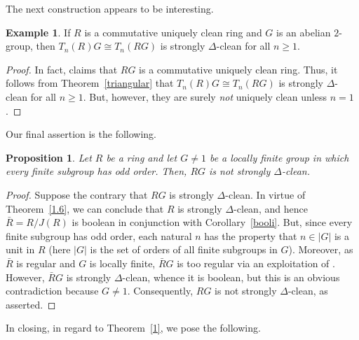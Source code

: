 \documentclass[12pt]{amsart}
\newtheorem{proposition}[theorem]{Proposition}
\theoremstyle{definition}
\newtheorem{example}[theorem]{Example}
\begin{document}

The next construction appears to be interesting.

\begin{example}
If $R$ is a commutative uniquely clean ring and $G$ is an abelian $2$-group, then $T_n(R)G\cong T_n(RG)$ is strongly $\Delta$-clean for all $n\geq 1$.
\end{example}

\begin{proof}
In fact, \cite[Theorem 12]{cnzg} claims that $RG$ is a commutative uniquely clean ring. Thus, it follows from
Theorem~\ref{triangular} that $T_n(R)G\cong T_n(RG)$ is strongly $\Delta$-clean for all $n\geq 1$. But, however, they are surely {\it not} uniquely clean unless $n=1$.
\end{proof}

Our final assertion is the following.

\begin{proposition}\label{group}
Let $R$ be a ring and let $G\neq 1$ be a locally finite group in which every finite subgroup has odd order. Then, $RG$ is not strongly $\Delta$-clean.
\end{proposition}

\begin{proof}
Suppose the contrary that $RG$ is strongly $\Delta$-clean. In virtue of Theorem~\ref{1.6}, we can conclude that $R$ is strongly $\Delta$-clean, and hence $\bar R=R/J(R)$ is boolean in conjunction with Corollary~\ref{booli}. But, since every finite subgroup has odd order, each natural $n$ has the property that $n\in |G|$ is a unit in $R$ (here $|G|$ is the set of orders of all finite subgroups in $G$). Moreover, as $\bar R$ is regular and $G$ is locally finite, $\bar RG$ is too regular via an exploitation of \cite[Theorem 3]{conel}. However, $\bar RG$ is strongly $\Delta$-clean, whence it is boolean, but this is an obvious contradiction because $G\neq 1$. Consequently, $RG$ is not strongly $\Delta$-clean, as asserted.
\end{proof}

In closing, in regard to Theorem~\ref{1}, we pose the following.

\medskip
\end{document}
